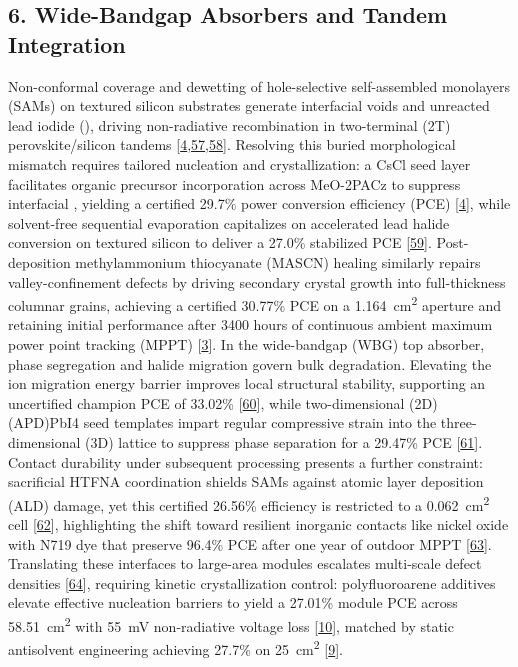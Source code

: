 \documentclass[
  11pt,
]{article}
\begin{document}
\subsection{6. Wide-Bandgap Absorbers and Tandem
Integration}\label{wide-bandgap-absorbers-and-tandem-integration}

Non-conformal coverage and dewetting of hole-selective self-assembled
monolayers (SAMs) on textured silicon substrates generate interfacial
voids and unreacted lead iodide (), driving non-radiative
recombination in two-terminal (2T) perovskite/silicon tandems
{[}\href{https://doi.org/10.1016/j.joule.2026.102645}{4},\href{https://doi.org/10.1002/aenm.71512}{57},\href{https://doi.org/10.1021/acsenergylett.6c01966}{58}{]}.
Resolving this buried morphological mismatch requires tailored
nucleation and crystallization: a CsCl seed layer facilitates organic
precursor incorporation across MeO-2PACz to suppress interfacial
, yielding a certified 29.7\% power conversion efficiency (PCE)
{[}\href{https://doi.org/10.1016/j.joule.2026.102645}{4}{]}, while
solvent-free sequential evaporation capitalizes on accelerated lead
halide conversion on textured silicon to deliver a 27.0\% stabilized PCE
{[}\href{https://doi.org/10.1016/j.joule.2026.102646}{59}{]}.
Post-deposition methylammonium thiocyanate (MASCN) healing similarly
repairs valley-confinement defects by driving secondary crystal growth
into full-thickness columnar grains, achieving a certified 30.77\% PCE
on a \qty{1.164}{\centi\meter\squared} aperture and retaining initial
performance after 3400 hours of continuous ambient maximum power point
tracking (MPPT)
{[}\href{https://doi.org/10.1038/s41467-026-76713-y}{3}{]}. In the
wide-bandgap (WBG) top absorber, phase segregation and halide migration
govern bulk degradation. Elevating the ion migration energy barrier
improves local structural stability, supporting an uncertified champion
PCE of 33.02\% {[}\href{https://doi.org/10.1002/adfm.77637}{60}{]},
while two-dimensional (2D) (APD)PbI4 seed templates impart regular
compressive strain into the three-dimensional (3D) lattice to suppress
phase separation for a 29.47\% PCE
{[}\href{https://doi.org/10.1021/acsnano.6c07355}{61}{]}. Contact
durability under subsequent processing presents a further constraint:
sacrificial HTFNA coordination shields SAMs against atomic layer
deposition (ALD) damage, yet this certified 26.56\% efficiency is
restricted to a \qty{0.062}{\centi\meter\squared} cell
{[}\href{https://doi.org/10.1002/adma.74461}{62}{]}, highlighting the
shift toward resilient inorganic contacts like nickel oxide with N719
dye that preserve 96.4\% PCE after one year of outdoor MPPT
{[}\href{https://doi.org/10.1021/acsenergylett.6c01363}{63}{]}.
Translating these interfaces to large-area modules escalates multi-scale
defect densities
{[}\href{https://doi.org/10.1002/adfm.202532038}{64}{]}, requiring
kinetic crystallization control: polyfluoroarene additives elevate
effective nucleation barriers to yield a 27.01\% module PCE across
\qty{58.51}{\centi\meter\squared} with \qty{55}{\milli\volt}
non-radiative voltage loss
{[}\href{https://doi.org/10.1002/adma.74469}{10}{]}, matched by static
antisolvent engineering achieving 27.7\% on
\qty{25}{\centi\meter\squared}
{[}\href{https://doi.org/10.1038/s43246-026-01321-8}{9}{]}.
\end{document}

